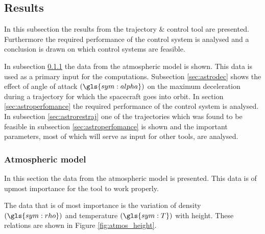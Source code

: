 \subsection{Results}
\label{sec:astrores}
In this subsection the results from the trajectory \& control tool are presented. Furthermore the required performance of the control system is analysed and a conclusion is drawn on which control systems are feasible.

In subsection \ref{sec:astroatmos} the data from the atmospheric model is shown. This data is used as a primary input for the computations. Subsection \ref{sec:astrodec} shows the effect of angle of attack $\left(\gls{sym:alpha}\right)$ on the maximum deceleration during a trajectory for which the spacecraft goes into orbit. In section \ref{sec:astroperfomance} the required performance of the control system is analysed. In subsection \ref{sec:astrorestraj} one of the trajectories which was found to be feasible in subsection \ref{sec:astroperfomance} is shown and the important parameters, most of which will serve as input for other tools, are analysed.

\subsubsection{Atmospheric model}
\label{sec:astroatmos}

In this section the data from the atmospheric model is presented. This data is of upmost importance for the tool to work properly.

The data that is of most importance is the variation of density $\left(\gls{sym:rho}\right)$ and temperature $\left(\gls{sym:T}\right)$ with height. These relations are shown in Figure \ref{fig:atmos_height}.

